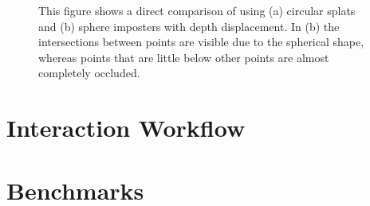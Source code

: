 \begin{figure}
\centering
{}
  
\caption{This figure shows a direct comparison of using (a) circular splats and (b) sphere imposters with depth displacement. In (b) the intersections between points are visible due to the spherical shape, whereas points that are little below other points are almost completely occluded.  }
\label{fig:point_sprites}
\end{figure}

 
\section{Interaction Workflow}
\section{Benchmarks}